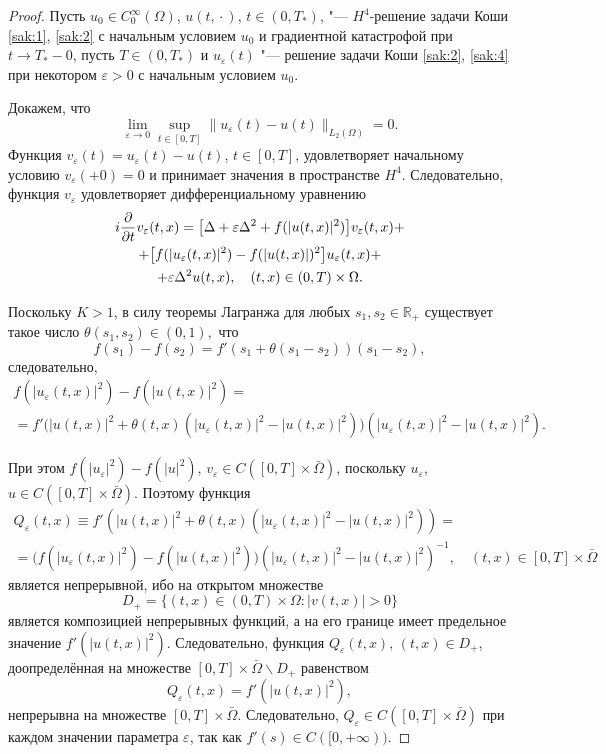 \begin{proof} Пусть $u_{0}\in C_{0}^{\infty}(\Omega )$, $u(t,{}\cdot{})$, $ t\in (0, T_{*})$, "--- $H^4$-решение задачи
Коши \eqref{sak:1}, \eqref{sak:2} с начальным условием $u_{0}$ и градиентной катастрофой при $t\to T_{*}-0 $, 
пусть $T\in (0,T_{*})$ и $u_{\varepsilon}(t)$ "--- решение задачи Коши \eqref{sak:2}, \eqref{sak:4} при некотором $\varepsilon>0$ с начальным условием $u_{0}$.

Докажем, что $$\lim\limits_{\varepsilon \to 0}\sup\limits_{t\in [0, T]}\|u_{\varepsilon }(t)-u(t)\|_{L_{2}(\Omega )}=0.$$ Функция $v_{\varepsilon}(t)
=u_{\varepsilon}(t)-u(t)$, $t\in [0, T]$, удовлетворяет начальному условию $v_{\varepsilon}(+0)=0$ и принимает значения в пространстве $H^4$.
Следовательно, функция $v_{\varepsilon}$ удовлетворяет дифференциальному уравнению \pagebreak
\begin{multline}
i{{\partial}\over {\partial t}}v_{\varepsilon }(t,x)=\bigl[\Delta +\varepsilon \Delta
^{2}+f(|u(t,x)|^2)\bigr]v_{\varepsilon}(t,x)+ \\  +
\bigl[f(|u_{\varepsilon }(t,x)|^2)-f(|u(t,x)|)^2\bigr]u_{\varepsilon }(t,x) + \\
+\varepsilon \Delta ^{2}u(t,x),\quad  (t,x)\in (0,T)\times \Omega.
\label{sak:9}
\end{multline}


Поскольку $K>1$,  в силу теоремы Лагранжа для любых
\mbox{$s_{1},s_{2}\in \mathbb R_{+}$}
существует такое число $\theta (s_{1},s_{2}) \in (0, 1),$ что
$$f(s_{1})-f(s_{2})=f'(s_{1}+\theta (s_{1}-s_{2}) )(s_{1}-s_{2}),$$
следовательно,
\begin{multline}
f(|u_{\varepsilon }(t,x)|^2)-f(|u(t,x)|^2)= \\ =f'\bigl(|u(t,x)|^2+\theta
(t,x)(|u_{\varepsilon  }(t,x)|^2-|u(t,x)|^2)\bigr)(|u_{\varepsilon }(t,x)|^2-|u(t,x)|^2).
\end{multline}

При этом $f(|u_{\varepsilon }|^2)-f(|u|^2)$, $v_{\varepsilon }\in  C([0,T]\times {\bar \Omega
} )$, поскольку $u_{\varepsilon }$, \mbox{$u\in C([0,T]\times {\bar \Omega } )$.}
Поэтому функция 
\begin{multline}
Q_{\varepsilon }(t,x)\equiv f'(|u(t,x)|^2+\theta
(t,x)(|u_{\varepsilon }(t,x)|^2-|u(t,x)|^2))= \\ =
\bigl(f(|u_{\varepsilon }(t,x)|^2)-f(|u(t,x)|^2)\bigr) (|u_{\varepsilon  }(t,x)|^2-|u(t,x)|^2)^{-1},\quad 
(t,x)\in [0, T]\times \bar \Omega 
\end{multline} является непрерывной, ибо на открытом множестве 
$$D_{+}=\{ (t,x)\in (0, T)\times \Omega : |v(t,x)|>0\}$$ является композицией непрерывных функций, а на
его границе имеет предельное значение $f'(|u(t,x)|^2)$. Следовательно,
функция $Q_{\varepsilon  }(t,x)$, $(t,x)\in D_{+}$, доопределённая на множестве $[0,T]\times \bar \Omega \backslash D_+$ равенством $$Q_{\varepsilon  }(t,x)=f'(|u(t,x)|^2),$$ непрерывна на множестве $[0,T]\times \bar \Omega .$
 Следовательно,  $Q_{\varepsilon }
\in C([0,T]\times \bar \Omega )$ при каждом значении параметра $\varepsilon $, так как $f'(s)\in C([0,+\infty ))$.


\end{proof}
